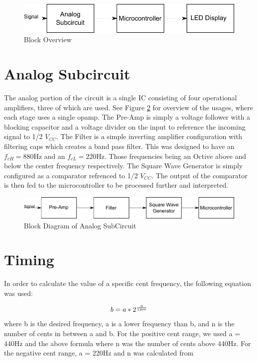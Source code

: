 \documentclass[12pt]{article}
\begin{document}
\begin{figure}[H]
\centering
	\includegraphics[width=6in]{"Block Overview"}
	\caption{Block Overview}
	\label{block_overview} 
\end{figure}

\section{Analog Subcircuit}
The analog portion of the circuit is a single IC consisting of four operational amplifiers, three of which are used. See Figure \ref{analog_block} for overview of the usages, where each stage uses a single opamp. The Pre-Amp is simply a voltage follower with a blocking capacitor and a voltage divider on the input to reference the incoming signal to 1/2 $V_{CC}$. The Filter is a simple inverting amplifier configuration with filtering caps which creates a band pass filter. This was designed to have an $f_{cH }= 880 \mbox{Hz}$ and an $f_{cL} = 220 \mbox{Hz}$. Those frequencies being an Octive above and below the center frequency respectively. The Square Wave Generator is simply configured as a comparator refrenced to 1/2 $V_{CC}$. The output of the comparator is then fed to the microcontroller to be processed further and interpreted.

\begin{figure}[H]
\centering
	\includegraphics[width=6in]{"Analog Subcircuit"}
	\caption{Block Diagram of Analog SubCircuit}
	\label{analog_block} 
\end{figure}

\section{Timing}

In order to calculate the value of a specific cent frequency, the following equation was used:

\begin{equation}
b = a * 2^{n \over 1200}
\end{equation}
where b is the desired frequency, a is a lower frequency than b, and n is the number of cents in between
a and b. For the positive cent range, we used a = 440Hz and the above formula where n was the number
of cents above 440Hz. For the negative cent range, a = 220Hz and n was calculated from
\end{document}
